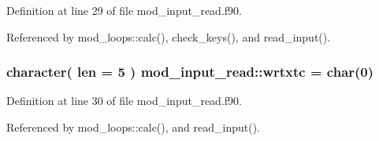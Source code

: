 Definition at line 29 of file mod\+\_\+input\+\_\+read.\+f90.



Referenced by mod\+\_\+loops\+::calc(), check\+\_\+keys(), and read\+\_\+input().

\subsubsection[{\texorpdfstring{wrtxtc}{wrtxtc}}]{\setlength{\rightskip}{0pt plus 5cm}character( len = 5 ) mod\+\_\+input\+\_\+read\+::wrtxtc = char(0)}\hypertarget{namespacemod__input__read_a27a1649717d0aa5463782f51c29102f4}{}\label{namespacemod__input__read_a27a1649717d0aa5463782f51c29102f4}


Definition at line 30 of file mod\+\_\+input\+\_\+read.\+f90.



Referenced by mod\+\_\+loops\+::calc(), and read\+\_\+input().

